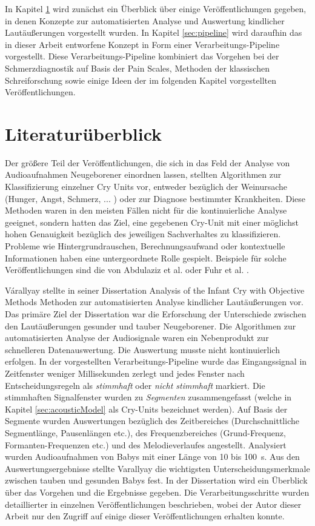 In Kapitel \ref{sec:system_literature} wird zunächst ein Überblick über einige Veröffentlichungen gegeben, in denen Konzepte zur automatisierten Analyse und Auswertung kindlicher Lautäußerungen vorgestellt wurden. In Kapitel \ref{sec:pipeline} wird daraufhin das in dieser Arbeit entworfene Konzept in Form einer Verarbeitungs-Pipeline vorgestellt. Diese Verarbeitungs-Pipeline kombiniert das Vorgehen bei der Schmerzdiagnostik auf Basis der Pain Scales, Methoden der klassischen Schreiforschung sowie einige Ideen der im folgenden Kapitel vorgestellten Veröffentlichungen.

\section{Literaturüberblick}
\label{sec:system_literature}

Der größere Teil der Veröffentlichungen, die sich in das Feld der Analyse von Audioaufnahmen Neugeborener einordnen lassen, stellten Algorithmen zur Klassifizierung einzelner Cry Units vor, entweder bezüglich der Weinursache (Hunger, Angst, Schmerz, ... ) oder zur Diagnose bestimmter Krankheiten. Diese Methoden waren in den meisten Fällen nicht für die kontinuierliche Analyse geeignet, sondern hatten das Ziel, eine gegebenen Cry-Unit mit einer möglichst hohen Genauigkeit bezüglich des jeweiligen Sachverhaltes zu klassifizieren. Probleme wie Hintergrundrauschen, Berechnungsaufwand oder kontextuelle Informationen haben eine untergeordnete Rolle gespielt. Beispiele für solche Veröffentlichungen sind die von Abdulaziz et al. \cite{class_abdulaziz} oder Fuhr et al. \cite{comparisonOfLearning}.

Várallyay stellte in seiner Dissertation \glqq Analysis of the Infant Cry with Objective Methods\grqq{} \cite{cry_thesis} Methoden zur automatisierten Analyse kindlicher Lautäußerungen vor. Das primäre Ziel der Dissertation war die Erforschung der Unterschiede zwischen den Lautäußerungen gesunder und tauber Neugeborener. Die Algorithmen zur automatisierten Analyse der Audiosignale waren ein \glqq Nebenprodukt\grqq{} zur schnelleren Datenauswertung. Die Auswertung musste nicht kontinuierlich erfolgen. In der vorgestellten Verarbeitungs-Pipeline wurde das Eingangssignal in Zeitfenster weniger Millisekunden zerlegt und jedes Fenster nach Entscheidungsregeln als \emph{stimmhaft} oder \emph{nicht stimmhaft} markiert. Die stimmhaften Signalfenster wurden zu \emph{Segmenten} zusammengefasst (welche in Kapitel \ref{sec:acousticModel} als Cry-Units bezeichnet werden). Auf Basis der Segmente wurden Auswertungen bezüglich des Zeitbereiches (Durchschnittliche Segmentlänge, Pausenlängen etc.), des Frequenzbereiches (Grund-Frequenz, Formanten-Frequenzen etc.) und des Melodieverlaufes angestellt. Analysiert wurden Audioaufnahmen von Babys mit einer Länge von 10 bis \SI{100}{\second}. Aus den Auswertungsergebnisse stellte Varallyay die wichtigsten Unterscheidungsmerkmale zwischen tauben und gesunden Babys fest. In der Dissertation \cite{cry_thesis} wird ein Überblick über das Vorgehen und die Ergebnisse gegeben. Die Verarbeitungsschritte wurden detaillierter in einzelnen Veröffentlichungen beschrieben, wobei der Autor dieser Arbeit nur den Zugriff auf einige dieser Veröffentlichungen erhalten konnte.


